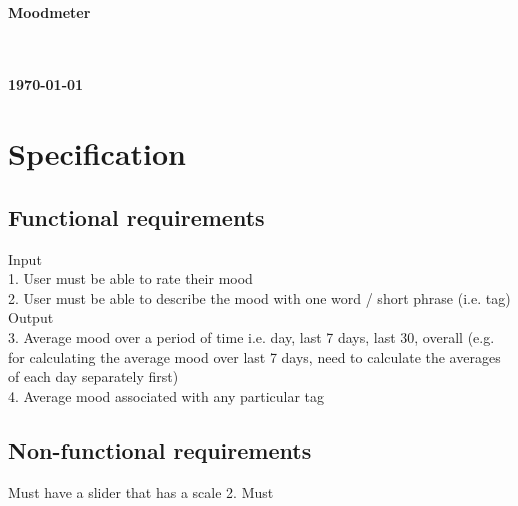\documentclass[12pt]{article}
\begin{document}
\begin{titlepage}
	\begin{center}
		
		
		\textbf{\LARGE }\\[2cm]
		
		\textbf{\Huge Moodmeter}\\[0.5cm]
		\textbf{\Huge }\\[1cm]
		
		\tableofcontents
		\vfill
		
		\textbf{\LARGE }\\[0.5cm]
		\textbf{\LARGE \today}
		
	\end{center}
\end{titlepage}




\section{Specification}

\subsection{Functional requirements}

Input\\
1. User must be able to rate their mood\\
2. User must be able to describe the mood with one word / short phrase (i.e. tag)\\

Output\\
3. Average mood over a period of time i.e. day, last 7 days, last 30, overall (e.g. for calculating the average mood over last 7 days, need to calculate the averages of each day separately first)\\
4. Average mood associated with any particular tag\\

\subsection{Non-functional requirements} 

Must have a slider that has a scale
2. Must 
\end{document}

